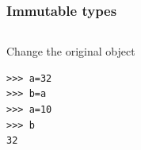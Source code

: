 \documentclass[colorlinks]{beamer}
\begin{document}
{

\begin{frame}[fragile]\frametitle{Immutable types}
\begin{columns}[T]
\begin{block}{Change the original object}
\begin{verbatim}
>>> a=32
>>> b=a
>>> a=10
>>> b
32
\end{verbatim}

\end{block}
\end{columns}

\end{frame}
}
\end{document}
